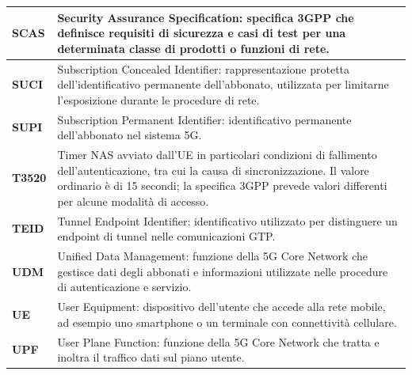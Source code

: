 \begin{longtable}{|>{\raggedright\arraybackslash}p{}|>{\raggedright\arraybackslash}p{}|}
\mbox{\textbf{SCAS}} & Security Assurance Specification: specifica 3GPP che definisce requisiti di sicurezza e casi di test per una determinata classe di prodotti o funzioni di rete. \\
\hline

\mbox{\textbf{SUCI}} & Subscription Concealed Identifier: rappresentazione protetta dell'identificativo permanente dell'abbonato, utilizzata per limitarne l'esposizione durante le procedure di rete. \\
\hline

\mbox{\textbf{SUPI}} & Subscription Permanent Identifier: identificativo permanente dell'abbonato nel sistema 5G. \\
\hline

\mbox{\textbf{T3520}} & Timer NAS avviato dall'UE in particolari condizioni di fallimento dell'autenticazione, tra cui la causa di sincronizzazione. Il valore ordinario è di 15 secondi; la specifica 3GPP prevede valori differenti per alcune modalità di accesso. \\
\hline

\mbox{\textbf{TEID}} & Tunnel Endpoint Identifier: identificativo utilizzato per distinguere un endpoint di tunnel nelle comunicazioni GTP. \\
\hline

\mbox{\textbf{UDM}} & Unified Data Management: funzione della 5G Core Network che gestisce dati degli abbonati e informazioni utilizzate nelle procedure di autenticazione e servizio. \\
\hline

\mbox{\textbf{UE}} & User Equipment: dispositivo dell'utente che accede alla rete mobile, ad esempio uno smartphone o un terminale con connettività cellulare. \\
\hline

\mbox{\textbf{UPF}} & User Plane Function: funzione della 5G Core Network che tratta e inoltra il traffico dati sul piano utente. \\
\hline

\end{longtable}
\endgroup
